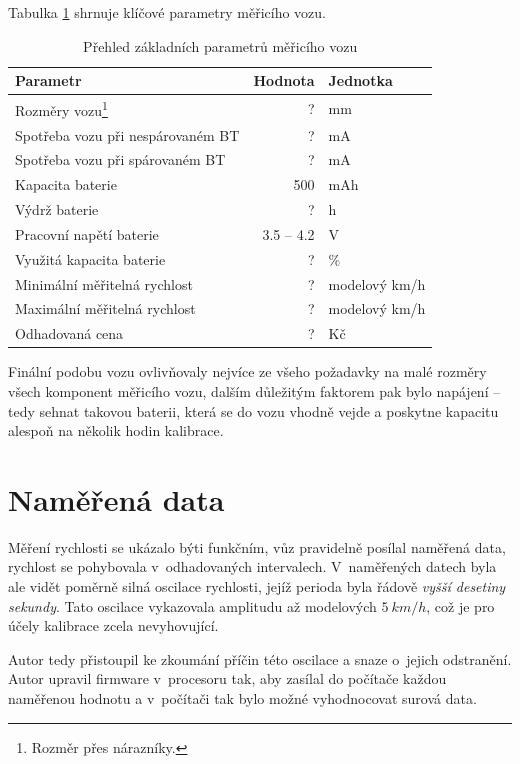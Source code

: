Tabulka \ref{tab:wsm-params} shrnuje klíčové parametry měřicího vozu.

\begin{table}
	\begin{tabularx}{\textwidth}{lrl}
		\toprule
		Parametr & Hodnota & Jednotka \\
		\midrule
		Rozměry vozu\footnote{Rozměr přes nárazníky.} & ? & mm \\
		Spotřeba vozu při nespárovaném BT & ? & mA \\
		Spotřeba vozu při spárovaném BT & ? & mA \\
		Kapacita baterie & 500 & mAh \\
		Výdrž baterie & ? & h \\
		Pracovní napětí baterie & 3.5 -- 4.2 & V \\
		Využitá kapacita baterie & ? & \% \\
		Minimální měřitelná rychlost & ? & modelový km/h\\
		Maximální měřitelná rychlost & ? & modelový km/h\\
		Odhadovaná cena & ? & Kč\\
		\bottomrule
	\end{tabularx}
	\caption{Přehled základních parametrů měřicího vozu}
	\label{tab:wsm-params}
\end{table}

Finální podobu vozu ovlivňovaly nejvíce ze všeho požadavky na malé rozměry všech
komponent měřicího vozu, dalším důležitým faktorem pak bylo napájení -- tedy
sehnat takovou baterii, která se do vozu vhodně vejde a poskytne kapacitu
alespoň na několik hodin kalibrace.

\section{Naměřená data}
\label{sec:wsm-data}

Měření rychlosti se ukázalo býti funkčním, vůz pravidelně posílal naměřená
data, rychlost se pohybovala v~odhadovaných intervalech. V~naměřených datech
byla ale vidět poměrně silná oscilace rychlosti, jejíž perioda byla řádově
\textit{vyšší desetiny sekundy}. Tato oscilace vykazovala amplitudu až
modelových $5\ km/h$, což je pro účely kalibrace zcela nevyhovující.

Autor tedy přistoupil ke zkoumání příčin této oscilace a snaze o~jejich
odstranění. Autor upravil firmware v~procesoru tak, aby zasílal do počítače
každou naměřenou hodnotu a v~počítači tak bylo možné vyhodnocovat surová data.

